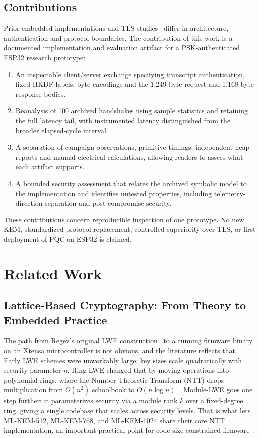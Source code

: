 \documentclass[journal, 10pt]{IEEEtran}
\begin{document}
\subsection{Contributions}
Prior embedded implementations and TLS studies~\cite{b6,b11,b12,b14,b42} differ in architecture, authentication and protocol boundaries. The contribution of this work is a documented implementation and evaluation artifact for a PSK-authenticated ESP32 research prototype:
\begin{enumerate}
    \item An inspectable client/server exchange specifying transcript authentication, fixed HKDF labels, byte encodings and the 1,249-byte request and 1,168-byte response bodies.
    \item Reanalysis of 100 archived handshakes using sample statistics and retaining the full latency tail, with instrumented latency distinguished from the broader elapsed-cycle interval.
    \item A separation of campaign observations, primitive timings, independent heap reports and manual electrical calculations, allowing readers to assess what each artifact supports.
    \item A bounded security assessment that relates the archived symbolic model to the implementation and identifies untested properties, including telemetry-direction separation and post-compromise security.
\end{enumerate}
These contributions concern reproducible inspection of one prototype. No new KEM, standardized protocol replacement, controlled superiority over TLS, or first deployment of PQC on ESP32 is claimed.

\section{Related Work}
\subsection{Lattice-Based Cryptography: From Theory to Embedded Practice}
The path from Regev's original LWE construction~\cite{b3} to a running firmware binary on an Xtensa microcontroller is not obvious, and the literature reflects that. Early LWE schemes were unworkably large; key sizes scale quadratically with security parameter $n$. Ring-LWE changed that by moving operations into polynomial rings, where the Number Theoretic Transform (NTT) drops multiplication from $O(n^2)$ schoolbook to $O(n \log n)$~\cite{b13,b26,b28}. Module-LWE goes one step further: it parameterizes security via a module rank $k$ over a fixed-degree ring, giving a single codebase that scales across security levels. That is what lets ML-KEM-512, ML-KEM-768, and ML-KEM-1024 share their core NTT implementation, an important practical point for code-size-constrained firmware~\cite{b2,b28}.
\end{document}
